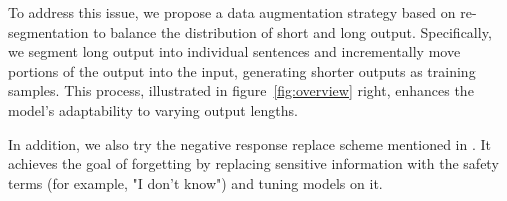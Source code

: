 \documentclass[11pt]{article}
\begin{document}

To address this issue, we propose a data augmentation strategy based on re-segmentation to balance the distribution of short and long output. Specifically, we segment long output into individual sentences and incrementally move portions of the output into the input, generating shorter outputs as training samples. This process, illustrated in figure~\ref{fig:overview} right, enhances the model's adaptability to varying output lengths.

In addition, we also try the negative response replace scheme mentioned in \cite{tofu2024}. It achieves the goal of forgetting by replacing sensitive information with the safety terms (for example, "I don't know") and tuning models on it.
\end{document}
